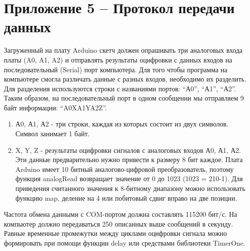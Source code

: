 \section*{Приложение 5 – Протокол передачи данных}

Загруженный на плату Arduino скетч должен опрашивать три аналоговых входа платы  (A0, A1, A2) и отправлять результаты оцифровки с данных входов на последовательный (Serial) порт компьютера. Для того чтобы программа на компьютере смогла различать данные с разных входов, необходимо их разделить. Для разделения используются строки с названиями портов: “А0”, “А1”, “А2”. Таким образом, на последовательный порт в одном сообщении мы отправляем 9 байт информации: “A0XA1YA2Z”.

\begin{enumerate}
\item А0, А1, А2 - три строки, каждая из которых состоит из двух символов. Символ занимает 1 байт. 
\item X, Y, Z - результаты оцифровки сигналов с аналоговых входов А0, А1, А2. Эти данные предварительно нужно привести к размеру 8 бит каждое. Плата Arduino имеет 10 битный аналогово-цифровой преобразователь, поэтому функция analogRead возвращает значение от 0 до 1023 (1023 = 210-1). Для приведения считанного значения к 8-битному диапазону можно использовать функцию map, деление на 4 или побитовый сдвиг вправо на две позиции.
\end{enumerate}

Частота обмена данными с COM-портом должна составлять 115200 бит/с. На компьютер должно передаваться 250 описанных выше сообщений в секунду. Равные временные промежутки между циклами оцифровки сигнала можно формировать при помощи функции delay или средствами библиотеки TimerOne.
 
